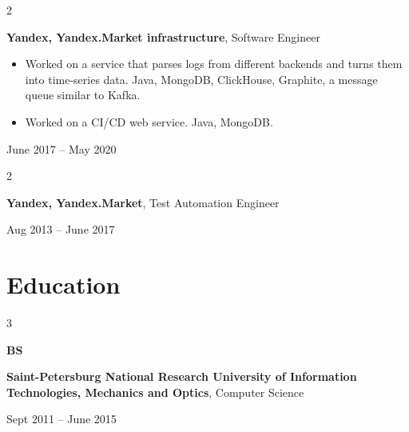 \documentclass[11pt, letterpaper]{article}
\newenvironment{highlights}{
    \begin{itemize}[
        topsep=0.10 cm,
        parsep=0.10 cm,
        partopsep=0pt,
        itemsep=0pt,
        leftmargin=0.4 cm + 10pt
    ]
}{
    \end{itemize}
} %
\newenvironment{twocolentry}[2][]{
    \onecolentry
    \def\secondColumn{#2}
    \setcolumnwidth{\fill, 4.5 cm}
    \begin{paracol}{2}
}{
    \switchcolumn \raggedleft \secondColumn
    \end{paracol}
    \endonecolentry
} %
\newenvironment{threecolentry}[3][]{
    \onecolentry
    \def\thirdColumn{#3}
    \setcolumnwidth{1 cm, \fill, 4.5 cm}
    \begin{paracol}{3}
    {\raggedright #2} \switchcolumn
}{
    \switchcolumn \raggedleft \thirdColumn
    \end{paracol}
    \endonecolentry
} %
\begin{document}
        \vspace{0.2 cm}

        \begin{twocolentry}{
            June 2017 – May 2020
        }
            \textbf{Yandex, Yandex.Market infrastructure}, Software Engineer
            \begin{highlights}
                \item Worked on a service that parses logs from different backends and turns them into time-series data. Java, MongoDB, ClickHouse, Graphite, a message queue similar to Kafka.
                \item Worked on a CI/CD web service. Java, MongoDB.
            \end{highlights}
        \end{twocolentry}


        \vspace{0.2 cm}

        \begin{twocolentry}{
            Aug 2013 – June 2017
        }
            \textbf{Yandex, Yandex.Market}, Test Automation Engineer
        \end{twocolentry}



    
    \section{Education}



        
        \begin{threecolentry}{\textbf{BS}}{
            Sept 2011 – June 2015
        }
            \textbf{Saint-Petersburg National Research University of Information Technologies, Mechanics and Optics}, Computer Science
        \end{threecolentry}


    
\end{document}
